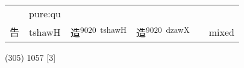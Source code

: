 \documentclass[14pt,a4paper]{scrartcl}
\begin{document}
\begin{longtable}[c]{@{}llllll@{}}
\begin{minipage}[t]{0.14\columnwidth}\raggedright\strut
\strut\end{minipage} &
\begin{minipage}[t]{0.14\columnwidth}\raggedright\strut
pure:qu
\strut\end{minipage}\tabularnewline
\begin{minipage}[t]{0.14\columnwidth}\raggedright\strut
告
\strut\end{minipage} &
\begin{minipage}[t]{0.14\columnwidth}\raggedright\strut
tshawH
\strut\end{minipage} &
\begin{minipage}[t]{0.14\columnwidth}\raggedright\strut
造\textsuperscript{9020~tshawH}
\strut\end{minipage} &
\begin{minipage}[t]{0.14\columnwidth}\raggedright\strut
造\textsuperscript{9020~dzawX}
\strut\end{minipage} &
\begin{minipage}[t]{0.14\columnwidth}\raggedright\strut
\strut\end{minipage} &
\begin{minipage}[t]{0.14\columnwidth}\raggedright\strut
mixed
\strut\end{minipage}\tabularnewline
\bottomrule
\end{longtable}

(305) 1057 {[}3{]}
\end{document}

